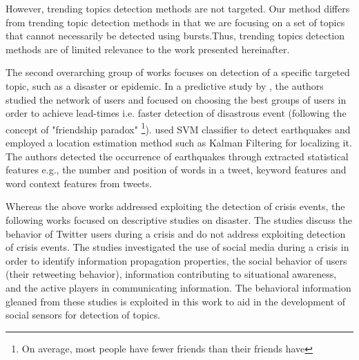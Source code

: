 However, trending topics detection methods are not targeted. Our method differs from trending topic detection methods in that we are focusing on a set of topics that cannot necessarily be detected using bursts.Thus, trending topics detection methods are of limited relevance to the work presented hereinafter.

The second overarching group of works focuses on detection of a specific targeted topic, such as a disaster or epidemic. In a predictive study by \cite{sandy}, the authors studied the network of users and focused on choosing the best groups of users in order to achieve lead-times i.e. faster detection of disastrous event (following the concept of "friendship paradox"\cite{feld} \footnote{On average, most people have fewer friends than their friends have}). \cite{sakakiEq2} used SVM classifier to detect earthquakes and employed a location estimation method such as Kalman Filtering for localizing it. The authors detected the occurrence of earthquakes through extracted statistical features e.g., the number and position of words in a tweet, keyword features and word context features from tweets.

Whereas the above works addressed exploiting the detection of crisis events, the following works focused on descriptive studies on disaster. The studies discuss the behavior of Twitter users during a crisis \cite{vieweg,cheong,starbird} and do not address exploiting detection of crisis events. The studies investigated the use of social media during a crisis in order to identify information propagation properties, the social behavior of users (their retweeting behavior), information contributing to situational awareness, and the active players in communicating information. The behavioral information gleaned from these studies is exploited in this work to aid in the development of social sensors for detection of topics.

